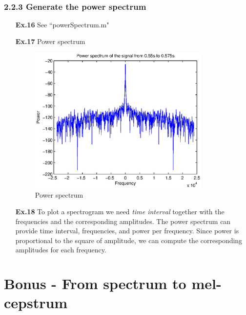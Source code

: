 \documentclass[a4paper]{article}
\begin{document}
\subsubsection*{2.2.3 Generate the power spectrum}
\begin{enumerate}
	\item[\textbf{Ex.16}] See ``powerSpectrum.m"
	\item[\textbf{Ex.17}] Power spectrum
	\begin{figure}[H]
		\begin{center}
			\includegraphics[width=0.85\textwidth]{ex17.eps}
			\caption{Power spectrum}\label{fig:powersp}		
		\end{center}
	\end{figure}
	
	\item[\textbf{Ex.18}]
	To plot a spectrogram we need \textit{time interval} together with the frequencies and the corresponding amplitudes.
	The power spectrum can provide time interval, frequencies, and power per frequency. \newline
	Since power is proportional to the square of amplitude, we can compute the corresponding amplitudes for each frequency.
\end{enumerate}

\section*{Bonus - From spectrum to mel-cepstrum}
\end{document}
